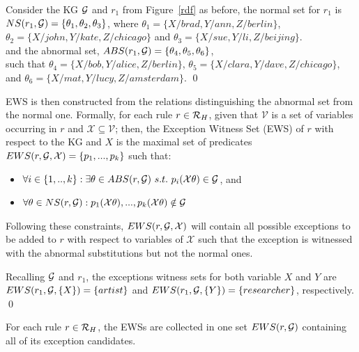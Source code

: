 \begin{example}
Consider the KG $\mathcal{G}$ and $r_1$ from Figure~\ref{rdf} as before, the normal set for $r_1$ is $NS(r_1,\mathcal{G})=\{\theta_1, \theta_2 ,\theta_3\}$, where $\theta_1 = \{X/brad, Y/ann, Z/berlin\}$,\\  $\theta_2 = \{X/john, Y/kate, Z/chicago\}$ and $\theta_3 = \{X/sue, Y/li, Z/beijing\}$.\\ and the abnormal set, $ABS(r_1,\mathcal{G})=\{\theta_4,\theta_5, \theta_6\}$, \\such that $\theta_4=\{X/bob, Y/alice, Z/berlin\}$,  $\theta_5=\{X/clara, Y/dave, Z/chicago\}$, and $\theta_6=\{X/mat, Y/lucy, Z/amsterdam\}$.
\qed
\end{example}

EWS is then constructed from the relations distinguishing the abnormal set from the normal one. Formally, for each rule $r \in \mathcal{R}_H$, given that $\mathcal{V}$ is a set of variables occurring in $r$ and $\mathcal{X} \subseteq \mathcal{V}$; then, the Exception Witness Set (EWS) of $r$ with respect to the KG and $X$ is  the maximal set of predicates $EWS(r,\mathcal{G},\mathcal{X}) = \{p_1,...,p_k\}$ such that:
\begin{itemize}
\item $\forall i \in \{1,..,k\} : \exists \theta \in ABS(r, \mathcal{G})\ s.t.\ p_i(\mathcal{X}\theta) \in \mathcal{G}$, and 
\item $\forall \theta \in NS(r,\mathcal{G}) :  p_1(\mathcal{X}\theta), ...,p_k(\mathcal{X}\theta) \notin \mathcal{G}$
\end{itemize}

Following these constraints, $EWS(r,\mathcal{G},\mathcal{X})$ will contain all possible exceptions to be added to $r$ with respect to variables of $\mathcal{X}$ such that the exception is witnessed with the abnormal substitutions but not the normal ones.


\begin{example}
Recalling $\mathcal{G}$ and $r_1$, the exceptions witness sets for both variable $X$ and $Y$ are $EWS(r_1,\mathcal{G},\{X\}) = \{artist\}$ and $EWS(r_1,\mathcal{G},\{Y\}) = \{researcher\}$, respectively.
\qed
\end{example}
For each rule $r \in \mathcal{R}_H$, the EWSs are collected in one set $EWS(r,\mathcal{G})$ containing all of its exception candidates. 


